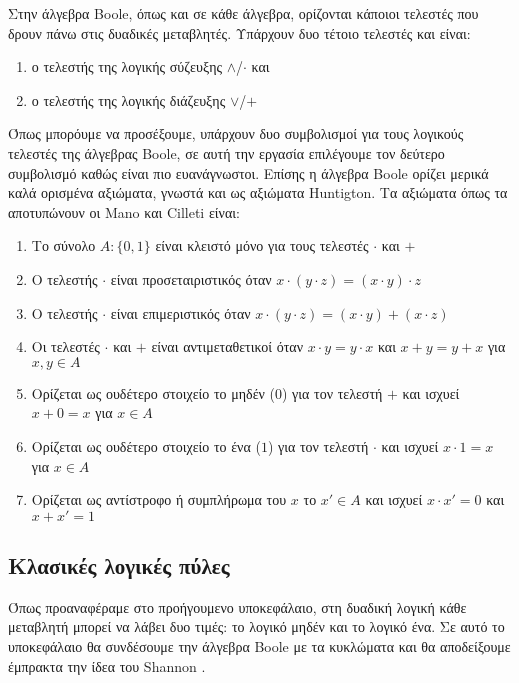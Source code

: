 Στην άλγεβρα Boole, όπως και σε κάθε άλγεβρα, ορίζονται κάποιοι τελεστές που δρουν πάνω στις δυαδικές μεταβλητές. Υπάρχουν δυο τέτοιο τελεστές και είναι:

\begin{enumerate}
    \item ο τελεστής της λογικής σύζευξης $\land$/$\cdot$ και
    \item ο τελεστής της λογικής διάζευξης $\lor$/$+$

\end{enumerate}
Όπως μπορόυμε να προσέξουμε, υπάρχουν δυο συμβολισμοί για τους λογικούς τελεστές της άλγεβρας Boole, σε αυτή την εργασία επιλέγουμε τον δεύτερο συμβολισμό
καθώς είναι πιο ευανάγνωστοι.
Επίσης η άλγεβρα Boole ορίζει μερικά καλά ορισμένα αξιώματα, γνωστά και ως αξιώματα Huntigton. Τα αξιώματα όπως τα αποτυπώνουν οι Mano και Cilleti
\cite{ManoCilleti2018} είναι:

\begin{enumerate}
    \item Το σύνολο $A: \{0, 1\}$ είναι κλειστό μόνο για τους τελεστές $\cdot$ και $+$
    \item Ο τελεστής $\cdot$ είναι προσεταιριστικός όταν $x \cdot (y \cdot z) = (x \cdot y) \cdot z$
    \item Ο τελεστής $\cdot$ είναι επιμεριστικός όταν $x \cdot (y \cdot z) = (x \cdot y) + (x \cdot z)$
    \item Οι τελεστές $\cdot$ και $+$ είναι αντιμεταθετικοί όταν $x \cdot y = y \cdot x$ και $x + y = y + x$ για $x,y \in A$
    \item Ορίζεται ως ουδέτερο στοιχείο το μηδέν ($0$) για τον τελεστή $+$ και ισχυεί $x + 0 = x$ για $x \in A$
    \item Ορίζεται ως ουδέτερο στοιχείο το ένα ($1$) για τον τελεστή $\cdot$ και ισχυεί $x \cdot 1 = x$ για $x \in A$
    \item Ορίζεται ως αντίστροφο ή συμπλήρωμα του $x$ το $x' \in A$ και ισχυεί $x \cdot x' = 0$ και $x + x' = 1$
\end{enumerate}

\subsection{Κλασικές λογικές πύλες}

Όπως προαναφέραμε στο προήγουμενο υποκεφάλαιο, στη δυαδική λογική κάθε μεταβλητή μπορεί να λάβει δυο τιμές: το λογικό μηδέν και το λογικό ένα.
Σε αυτό το υποκεφάλαιο θα συνδέσουμε την άλγεβρα Boole με τα κυκλώματα και θα αποδείξουμε έμπρακτα την ίδεα του Shannon \cite{Shannon1940}.

